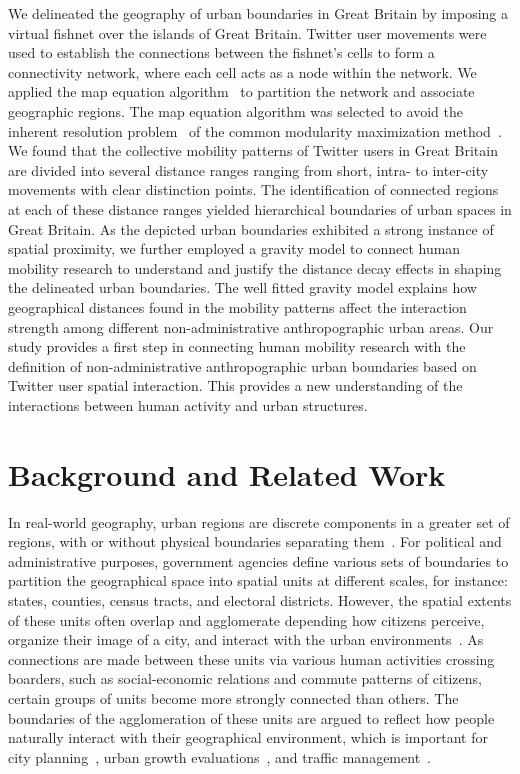 \documentclass[]{tGIS2e}
\begin{document}
We delineated the geography of urban boundaries in Great Britain by imposing a virtual fishnet over the islands of Great Britain.
Twitter user movements were used to establish the connections between the fishnet's cells to form a connectivity network, where each cell acts as a node within the network.
We applied the map equation algorithm~\citep{domenico2015} to partition the network and associate geographic regions.
The map equation algorithm was selected to avoid the inherent resolution problem~\citep{fortunato2007} of the common modularity maximization method~\citep{newman2006}. 
We found that the collective mobility patterns of Twitter users in Great Britain are divided into several distance ranges ranging from short, intra- to inter-city movements with clear distinction points. 
The identification of connected regions at each of these distance ranges yielded hierarchical boundaries of urban spaces in Great Britain.
As the depicted urban boundaries exhibited a strong instance of spatial proximity, we further employed a gravity model to connect human mobility research to understand and justify the distance decay effects in shaping the delineated urban boundaries.
The well fitted gravity model explains how geographical distances found in the mobility patterns affect the interaction strength among different non-administrative anthropographic urban areas. 
Our study provides a first step in connecting human mobility research with the definition of non-administrative anthropographic urban boundaries based on Twitter user spatial interaction. 
This provides a new understanding of the interactions between human activity and urban structures. 

\section{Background and Related Work}
In real-world geography, urban regions are discrete components in a greater set of regions, with or without physical boundaries separating them~\citep{jiang2015}.
For political and administrative purposes, government agencies define various sets of boundaries to partition the geographical space into spatial units at different scales, for instance: states, counties, census tracts, and electoral districts.
However, the spatial extents of these units often overlap and agglomerate depending how citizens perceive, organize their image of a city, and interact with the urban environments~\citep{lynch1960}.
As connections are made between these units via various human activities crossing boarders, such as social-economic relations and commute patterns of citizens, certain groups of units become more strongly connected than others. The boundaries of the agglomeration of these units are argued to reflect how people naturally interact with their geographical environment, which is important for city planning~\citep{hollenstein2010}, urban growth evaluations~\citep{jiang2015,long2015}, and traffic management~\citep{gao2014}. 
\end{document}
